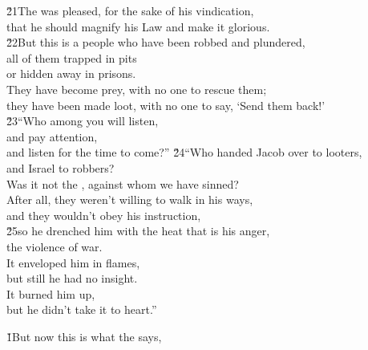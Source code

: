 \begin{poetry}
\poeml \v{21}The  was pleased, for the sake of his vindication, \\
\poemll    that he should magnify his Law and make it glorious. \\
\poeml \v{22}But this is a people who have been robbed and plundered, \\
\poemll    all of them trapped in pits \\
\poemlll       or hidden away in prisons. \\
\poeml They have become prey, with no one to rescue them; \\
\poemll    they have been made loot, with no one to say, `Send them back!' \\
\poeml \v{23}``Who among you will listen, \\
\poemll    and pay attention, \\
\poemlll       and listen for the time to come?''
\poeml \v{24}``Who handed Jacob over to looters, \\
\poemll    and Israel to robbers? \\
\poeml Was it not the , against whom we have sinned? \\
\poemll    After all, they weren't willing to walk in his ways, \\
\poemlll       and they wouldn't obey his instruction, \\
\poeml \v{25}so he drenched him with the heat that is his anger, \\
\poemll    the violence of war. \\
\poeml It enveloped him in flames, \\
\poemll    but still he had no insight. \\
\poeml It burned him up, \\
\poemll    but he didn't take it to heart.''
\end{poetry}

\v{1}But now this is what the  says,

